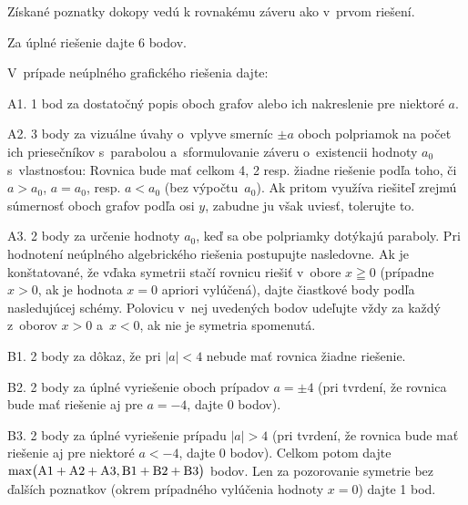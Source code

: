 {Získané poznatky dokopy vedú k rovnakému záveru
ako v~prvom riešení.

\schemaABC
Za úplné riešenie dajte 6 bodov.

\smallskip
V~prípade neúplného grafického riešenia dajte:
\item{A1.} 1 bod za dostatočný popis oboch grafov alebo ich nakreslenie pre niektoré $a$.
\item{A2.} 3 body za vizuálne úvahy o~vplyve smerníc $\pm a$ oboch polpriamok na počet ich priesečníkov s~parabolou a~sformulovanie záveru o~existencii hodnoty $a_0$ s~vlastnosťou: Rovnica bude mať celkom 4, 2 resp. žiadne riešenie podľa toho, či $a>a_0$, $a=a_0$, resp. $a<a_0$ (bez výpočtu~$a_0$). Ak pritom využíva riešiteľ zrejmú súmernosť oboch grafov podľa osi $y$, zabudne ju však uviesť, tolerujte to.
\item{A3.} 2 body za určenie hodnoty $a_0$, keď sa obe polpriamky dotýkajú paraboly.
\endgraf\noindent
Pri hodnotení neúplného algebrického riešenia postupujte
nasledovne. Ak je konštatované, že vďaka symetrii
stačí rovnicu riešiť v~obore $x\geqq0$ (prípadne
$x>0$, ak je hodnota $x=0$ apriori vylúčená), dajte čiastkové
body podľa nasledujúcej schémy. Polovicu v~nej uvedených bodov
udeľujte vždy za každý z~oborov $x>0$ a~$x<0$, ak nie je symetria
spomenutá.
\item{B1.} 2 body za dôkaz, že pri $|a|<4$ nebude mať rovnica žiadne riešenie.
\item{B2.} 2 body za úplné vyriešenie oboch prípadov $a=\pm4$ (pri tvrdení, že rovnica bude mať riešenie aj pre $a={-4}$, dajte 0 bodov).
\item{B3.} 2 body za úplné vyriešenie prípadu $|a|>4$ (pri tvrdení, že rovnica bude mať riešenie aj pre niektoré $a<{-4}$, dajte 0 bodov).
\endgraf\noindent
Celkom potom dajte
$\rm\max\bigl({A1}+{A2}+{A3},{B1}+{B2}+{B3}\bigr)$
bodov. Len za pozorovanie symetrie bez ďalších poznatkov
(okrem prípadného vylúčenia hodnoty $x=0$) dajte 1 bod.
\endschema
}

